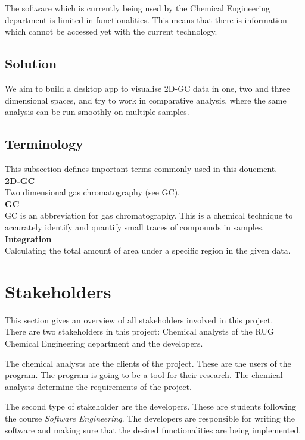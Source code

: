 \documentclass{article}
\begin{document}
The software which is currently being used by the Chemical Engineering department is limited in functionalities. This means that there is information which cannot be accessed yet with the current technology. 

\subsection*{Solution}
We aim to build a desktop app to visualise 2D-GC data in one, two and three dimensional spaces, and try to work in comparative analysis, where the same analysis can be run smoothly on multiple samples. 

\subsection*{Terminology}
This subsection defines important terms commonly used in this doucment. \\

\noindent \textbf{2D-GC} \\
Two dimensional gas chromatography (see GC). \\

\noindent \textbf{GC} \\
GC is an abbreviation for gas chromatography. This is a chemical technique to accurately identify and quantify small traces of compounds in samples. \\

\noindent \textbf{Integration} \\
Calculating the total amount of area under a specific region in the given data. 

\section{Stakeholders}

This section gives an overview of all stakeholders involved in this project. \\

\noindent There are two stakeholders in this project: Chemical analysts of the RUG Chemical Engineering department and the developers.

The chemical analysts are the clients of the project. These are the users of the program. The program is going to be a tool for their research. The chemical analysts determine the requirements of the project.

The second type of stakeholder are the developers. These are students following the course \textit{Software Engineering}. The developers are responsible for writing the software and making sure that the desired functionalities are being implemented.
\end{document}
